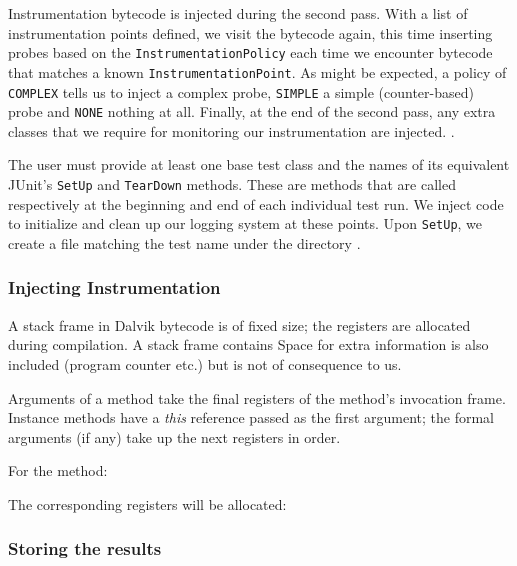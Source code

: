 Instrumentation bytecode is injected during the second pass. With a list of instrumentation points defined, we visit the bytecode again, this time inserting probes based on the {\tt InstrumentationPolicy} each time we encounter bytecode that matches a known {\tt InstrumentationPoint}. As might be expected, a policy of {\tt COMPLEX} tells us to inject a complex probe, {\tt SIMPLE} a simple (counter-based) probe and {\tt NONE} nothing at all. Finally, at the end of the second pass, any extra classes that we require for monitoring our instrumentation are injected. .

The user must provide at least one base test class and the names of its equivalent JUnit's {\tt SetUp} and {\tt TearDown} methods. These are methods that are called respectively at the beginning and end of each individual test run. We inject code to initialize and clean up our logging system at these points. Upon {\tt SetUp}, we create a file matching the test name  under the directory .

\subsubsection{Injecting Instrumentation}

A stack frame in Dalvik bytecode is of fixed size; the registers are allocated during compilation. A stack frame contains  Space for extra information is also included (program counter etc.) but is not of consequence to us.

Arguments of a method take the final registers of the method's invocation frame. Instance methods have a \textit{this} reference passed as the first argument; the formal arguments (if any) take up the next registers in order.

For the method:


The corresponding registers will be allocated:



\subsubsection{Storing the results}

